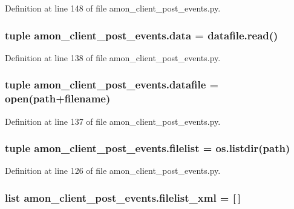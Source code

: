 Definition at line 148 of file amon\-\_\-client\-\_\-post\-\_\-events.\-py.

\hypertarget{namespaceamon__client__post__events_a15fe42ff6e69403619e0bc52518c867d}{
\subsubsection[{data}]{\setlength{\rightskip}{0pt plus 5cm}tuple amon\-\_\-client\-\_\-post\-\_\-events.\-data = datafile.\-read()}}\label{namespaceamon__client__post__events_a15fe42ff6e69403619e0bc52518c867d}


Definition at line 138 of file amon\-\_\-client\-\_\-post\-\_\-events.\-py.

\hypertarget{namespaceamon__client__post__events_a1b0936a861518a5a9dcf1d57c37bd61f}{
\subsubsection[{datafile}]{\setlength{\rightskip}{0pt plus 5cm}tuple amon\-\_\-client\-\_\-post\-\_\-events.\-datafile = open({\bf path}+filename)}}\label{namespaceamon__client__post__events_a1b0936a861518a5a9dcf1d57c37bd61f}


Definition at line 137 of file amon\-\_\-client\-\_\-post\-\_\-events.\-py.

\hypertarget{namespaceamon__client__post__events_a965df8add9147fd407c543b219762f2a}{
\subsubsection[{filelist}]{\setlength{\rightskip}{0pt plus 5cm}tuple amon\-\_\-client\-\_\-post\-\_\-events.\-filelist = os.\-listdir({\bf path})}}\label{namespaceamon__client__post__events_a965df8add9147fd407c543b219762f2a}


Definition at line 126 of file amon\-\_\-client\-\_\-post\-\_\-events.\-py.

\hypertarget{namespaceamon__client__post__events_a9b83b7a9506f77788a8ceabdf9c5e126}{
\subsubsection[{filelist\-\_\-xml}]{\setlength{\rightskip}{0pt plus 5cm}list amon\-\_\-client\-\_\-post\-\_\-events.\-filelist\-\_\-xml = \mbox{[}$\,$\mbox{]}}}\label{namespaceamon__client__post__events_a9b83b7a9506f77788a8ceabdf9c5e126}


